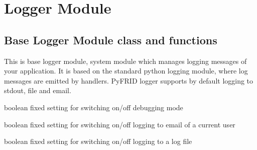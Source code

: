 \documentclass[letterpaper,10pt,english]{sphinxmanual}
\begin{document}
\section{Logger Module}
\label{sysmod:logger-module}

\subsection{Base Logger Module class and functions}
\label{sysmod:module-pyfrid.modules.system.logger}\label{sysmod:base-logger-module-class-and-functions}

\begin{fulllineitems}
\label{sysmod:pyfrid.modules.system.logger.BaseLoggerModule}
This is base logger module, system module which manages logging messages of your application.
It is based on the standard python logging module, where log messages are emitted by handlers.
PyFRID logger supports by default logging to stdout, file and email.

\begin{fulllineitems}
\label{sysmod:pyfrid.modules.system.logger.BaseLoggerModule.debugmode}
boolean fixed setting for switching on/off debugging mode

\end{fulllineitems}


\begin{fulllineitems}
\label{sysmod:pyfrid.modules.system.logger.BaseLoggerModule.email_log}
boolean fixed setting for switching on/off logging to email of a current user

\end{fulllineitems}


\begin{fulllineitems}
\label{sysmod:pyfrid.modules.system.logger.BaseLoggerModule.file_log}
boolean fixed setting for switching on/off logging to a log file


\end{fulllineitems}
\end{fulllineitems}
\end{document}
